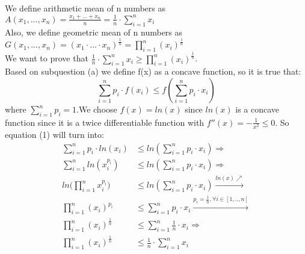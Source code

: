 \documentclass[11pt]{537homework}
\begin{document}
\subsection{}
We define arithmetic mean of n numbers as $A(x_1,...,x_n)= \frac{x_1+...+x_n}{n} = \displaystyle{\frac{1}{n} \cdot \sum_{i=1}^{n} x_i } $\\
Also, we define geometric mean of n numbers as $G(x_1,...,x_n)= {(x_1\cdot...\cdot x_n)}^{\frac{1}{n}} = \displaystyle{\prod_{i=1}^{n} (x_i)^{\frac{1}{n}}} $\\
We want to prove that $\displaystyle{\frac{1}{n} \cdot \sum_{i=1}^{n} x_i} \geq \displaystyle{\prod_{i=1}^{n} (x_i)^{\frac{1}{n}}}$.\\
Based on subquestion (a) we define f(x) as a concave function, so it is true that:
\begin{equation}
     \displaystyle{\sum_{i=1}^{n} p_i \cdot f(x_i)} \leq \displaystyle{f(\sum_{i=1}^{n} p_i \cdot x_i)}
\end{equation} 
where  $\displaystyle{\sum_{i=1}^{n} p_i =1}$.We choose $f(x)=ln(x)$ since $ln(x)$ is a concave function since it is a twice differentiable function with $f''(x) = -  \frac{1}{x^2} \leq 0$. So equation (1) will turn into:\\
\begingroup
\allowdisplaybreaks
\begin{align*}
     \displaystyle{\sum_{i=1}^{n} p_i \cdot ln(x_i)} &\leq \displaystyle{ln(\sum_{i=1}^{n} p_i \cdot x_i)} \Longrightarrow\\
     \displaystyle{\sum_{i=1}^{n} ln(x_i^{p_i})} &\leq \displaystyle{ln(\sum_{i=1}^{n} p_i \cdot x_i)} \Longrightarrow\\
     \displaystyle{ln(\prod_{i=1}^{n} x_i^{p_i}}) &\leq \displaystyle{ln(\sum_{i=1}^{n} p_i \cdot x_i)} \xrightarrow{ln(x) \nearrow }\\
     \displaystyle{\prod_{i=1}^{n} (x_i)^{p_i}} &\leq \displaystyle{\sum_{i=1}^{n} p_i \cdot x_i} \xrightarrow{p_i = \frac{1}{n},\forall i \in [1,..,n] }\\
     \displaystyle{\prod_{i=1}^{n} (x_i)^{\frac{1}{n}}} &\leq \displaystyle{\sum_{i=1}^{n} \frac{1}{n} \cdot x_i} \Longrightarrow \\
     \displaystyle{\prod_{i=1}^{n} (x_i)^{\frac{1}{n}}} &\leq \displaystyle{\frac{1}{n} \cdot \sum_{i=1}^{n} x_i} 
\end{align*}
\endgroup
 
\end{document}
